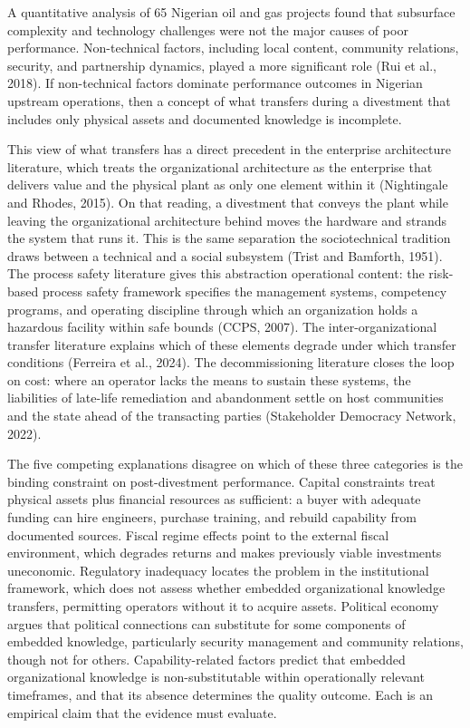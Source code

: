 A quantitative analysis of 65 Nigerian oil and gas projects found that
subsurface complexity and technology challenges were not the major
causes of poor performance. Non-technical factors, including local
content, community relations, security, and partnership dynamics, played
a more significant role (Rui et al., 2018). If non-technical factors
dominate performance outcomes in Nigerian upstream operations, then a
concept of what transfers during a divestment that includes only
physical assets and documented knowledge is incomplete.

This view of what transfers has a direct precedent in the enterprise
architecture literature, which treats the organizational architecture as
the enterprise that delivers value and the physical plant as only one
element within it (Nightingale and Rhodes, 2015). On that reading, a
divestment that conveys the plant while leaving the organizational
architecture behind moves the hardware and strands the system that runs
it. This is the same separation the sociotechnical tradition draws
between a technical and a social subsystem (Trist and Bamforth, 1951).
The process safety literature gives this abstraction operational
content: the risk-based process safety framework specifies the
management systems, competency programs, and operating discipline
through which an organization holds a hazardous facility within safe
bounds (CCPS, 2007). The inter-organizational transfer literature
explains which of these elements degrade under which transfer conditions
(Ferreira et al., 2024). The decommissioning literature closes the loop
on cost: where an operator lacks the means to sustain these systems, the
liabilities of late-life remediation and abandonment settle on host
communities and the state ahead of the transacting parties (Stakeholder
Democracy Network, 2022).

The five competing explanations disagree on which of these three
categories is the binding constraint on post-divestment performance.
Capital constraints treat physical assets plus financial resources as
sufficient: a buyer with adequate funding can hire engineers, purchase
training, and rebuild capability from documented sources. Fiscal regime
effects point to the external fiscal environment, which degrades returns
and makes previously viable investments uneconomic. Regulatory
inadequacy locates the problem in the institutional framework, which
does not assess whether embedded organizational knowledge transfers,
permitting operators without it to acquire assets. Political economy
argues that political connections can substitute for some components of
embedded knowledge, particularly security management and community
relations, though not for others. Capability-related factors predict
that embedded organizational knowledge is non-substitutable within
operationally relevant timeframes, and that its absence determines the
quality outcome. Each is an empirical claim that the evidence must
evaluate.

